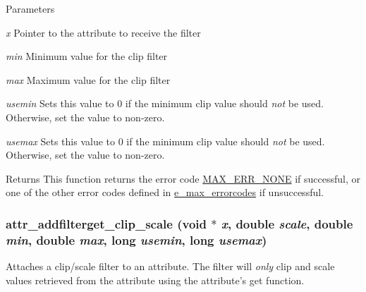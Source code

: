 \begin{DoxyParams}{Parameters}
\item[{\em x}]Pointer to the attribute to receive the filter \item[{\em min}]Minimum value for the clip filter \item[{\em max}]Maximum value for the clip filter \item[{\em usemin}]Sets this value to 0 if the minimum clip value should {\itshape not\/} be used. Otherwise, set the value to non-\/zero. \item[{\em usemax}]Sets this value to 0 if the minimum clip value should {\itshape not\/} be used. Otherwise, set the value to non-\/zero.\end{DoxyParams}
\begin{DoxyReturn}{Returns}
This function returns the error code \hyperlink{group__misc_gga0764dd6c02b76cca7d053ae50555d69da6d22f77fef8b1e1b074cef5d29d935fd}{MAX\_\-ERR\_\-NONE} if successful, or one of the other error codes defined in \hyperlink{group__misc_ga0764dd6c02b76cca7d053ae50555d69d}{e\_\-max\_\-errorcodes} if unsuccessful. 
\end{DoxyReturn}
\hypertarget{group__attr_gac8c4540125b628619068d1bbb9472c48}{
\subsubsection[{attr\_\-addfilterget\_\-clip\_\-scale}]{ attr\_\-addfilterget\_\-clip\_\-scale (void $\ast$ {\em x}, \/  double {\em scale}, \/  double {\em min}, \/  double {\em max}, \/  long {\em usemin}, \/  long {\em usemax})}}
\label{group__attr_gac8c4540125b628619068d1bbb9472c48}


Attaches a clip/scale filter to an attribute. The filter will {\itshape only\/} clip and scale values retrieved from the attribute using the attribute's {\ttfamily get} function.


